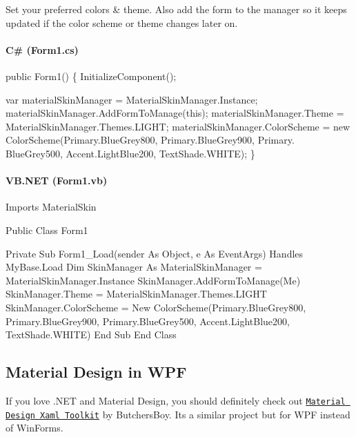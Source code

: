 Set your preferred colors \& theme. Also add the form to the manager so it keeps updated if the color scheme or theme changes later on.

\paragraph*{C\# (Form1.\+cs)}


\begin{DoxyCode}
\textcolor{keyword}{public} Form1()
\{
    InitializeComponent();

    var materialSkinManager = MaterialSkinManager.Instance;
    materialSkinManager.AddFormToManage(\textcolor{keyword}{this});
    materialSkinManager.Theme = MaterialSkinManager.Themes.LIGHT;
    materialSkinManager.ColorScheme = \textcolor{keyword}{new} ColorScheme(Primary.BlueGrey800, Primary.BlueGrey900, Primary.
      BlueGrey500, Accent.LightBlue200, TextShade.WHITE);
\}
\end{DoxyCode}


\paragraph*{V\+B.\+N\+ET (Form1.\+vb)}


\begin{DoxyCode}
Imports MaterialSkin

Public Class Form1

    Private Sub Form1\_Load(sender As Object, e As EventArgs) Handles MyBase.Load
        Dim SkinManager As MaterialSkinManager = MaterialSkinManager.Instance
        SkinManager.AddFormToManage(Me)
        SkinManager.Theme = MaterialSkinManager.Themes.LIGHT
        SkinManager.ColorScheme = New ColorScheme(Primary.BlueGrey800, Primary.BlueGrey900,
       Primary.BlueGrey500, Accent.LightBlue200, TextShade.WHITE)
    End Sub
End Class
\end{DoxyCode}
 



\subsection*{Material Design in W\+PF}

If you love .N\+ET and Material Design, you should definitely check out \href{https://github.com/ButchersBoy/MaterialDesignInXamlToolkit}{\tt Material Design Xaml Toolkit} by Butchers\+Boy. It\textquotesingle{}s a similar project but for W\+PF instead of Win\+Forms. 



